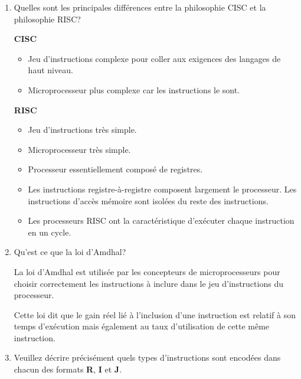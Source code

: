 \begin{enumerate}
  \item
    Quelles sont les principales diff\'erences entre la philosophie CISC
    et la philosophie RISC?

    \begin{correction}

      \textbf{CISC}

      \begin{itemize}
	\item
	  Jeu d'instructions complexe pour coller aux exigences des
	  langages de haut niveau.
	\item
	  Microprocesseur plus complexe car les instructions le sont.
      \end{itemize}

      \textbf{RISC}

      \begin{itemize}
	\item
	  Jeu d'instructions tr\`es simple.
	\item
	  Microprocesseur tr\`es simple.
	\item
	  Processeur essentiellement compos\'e de registres.
	\item
	  Les instructions registre-\`a-registre composent largement le
	  processeur. Les instructions d'acc\`es m\'emoire sont isol\'ees du
	  reste des instructions.
	\item
	  Les processeurs RISC ont la caract\'eristique d'ex\'ecuter chaque
	  instruction en un cycle.
      \end{itemize}

    \end{correction}
  \item
    Qu'est ce que la loi d'Amdhal?

    \begin{correction}

      La loi d'Amdhal est utilis\'ee par les concepteurs de microprocesseurs
      pour choisir correctement les instructions \`a inclure dans le
      jeu d'instructions du processeur.

      Cette loi dit que le gain r\'eel li\'e \`a l'inclusion d'une instruction
      est relatif \`a son temps d'ex\'ecution mais \'egalement au
      taux d'utilisation de cette m\^eme instruction.

    \end{correction}
  \item
    Veuillez d\'ecrire pr\'ecis\'ement quels types d'instructions sont
    encod\'ees dans chacun des formats \textbf{R}, \textbf{I} et \textbf{J}.


\end{enumerate}
